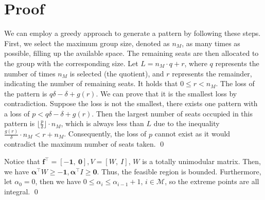 \clearpage
\section*{Proof}

\begin{pf}[Proof of Lemma \ref{lem_pattern}]
We can employ a greedy approach to generate a pattern by following these steps. First, we select the maximum group size, denoted as $n_M$, as many times as possible, filling up the available space. The remaining seats are then allocated to the group with the corresponding size. Let $L = n_M \cdot q + r$, where $q$ represents the number of times $n_M$ is selected (the quotient), and $r$ represents the remainder, indicating the number of remaining seats. It holds that $0 \leq r < n_M$. The loss of the pattern is $q \delta -\delta + g(r)$. We can prove that it is the smallest loss by contradiction. 
Suppose the loss is not the smallest, there exists one pattern with a loss of $p < q \delta -\delta + g(r)$. Then the largest number of seats occupied in this pattern is $\lfloor \frac{p}{\delta} \rfloor \cdot n_M$, which is always less than $L$ due to the inequality $\frac{g(r)}{\delta} \cdot n_M < r + n_M$. Consequently, the loss of $p$ cannot exist as it would contradict the maximum number of seats taken.
\qed
\end{pf}



\begin{pf}
  Notice that $\mathbf{f}^{\intercal} = [-\mathbf{1},~\mathbf{0}], V =[W,~I]$, $W$ is a totally unimodular matrix. Then, we have $\bm{\alpha}^{\intercal}W \geq -\mathbf{1}, \bm{\alpha}^{\intercal} I \geq \mathbf{0}$. Thus, the feasible region is bounded. 
  Furthermore, let $\alpha_0 = 0$, then we have $0 \leq \alpha_i \leq \alpha_{i-1} +1$, $i \in \mathcal{M}$, so the extreme points are all integral.
  \qed
\end{pf}

